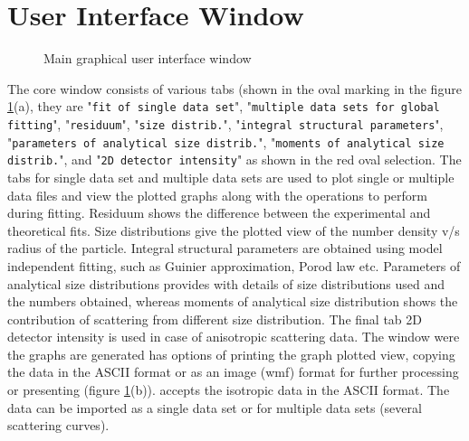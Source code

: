 \section{User Interface Window}
\begin{figure}[htb]
\centering
\caption{Main \SASfit graphical user interface window}
\label{fig:QTmain}
\end{figure}
\sloppy
The core \SASfit window consists of various tabs (shown in the oval
marking in the figure \ref{fig:QTmain}(a), they are "\texttt{fit of single data set}",
"\texttt{multiple data sets for global fitting}", "\texttt{residuum}", "\texttt{size
distrib.}", "\texttt{integral structural parameters}", "\texttt{parameters of
analytical size distrib.}", "\texttt{moments of analytical size
distrib.}", and "\texttt{2D detector intensity}" as shown in the red oval
selection. The tabs for single data set and multiple data sets are used to
plot single or multiple data files and view the plotted graphs along
with the operations to perform during fitting. Residuum shows the
difference between the experimental and theoretical fits. Size
distributions give the plotted view of the number density v/s radius
of the particle. Integral structural parameters are obtained using
model independent fitting, such as Guinier approximation, Porod law
etc. Parameters of analytical size distributions provides with
details of size distributions used and the numbers obtained, whereas
moments of analytical size distribution shows the contribution of
scattering from different size distribution. The final tab 2D
detector intensity is used in case of anisotropic scattering data.
The window were the graphs are generated has options of printing the
graph plotted view, copying the data in the ASCII format or as an
image (wmf) format for further processing or presenting (figure
\ref{fig:QTmain}(b)). \SASfit accepts the isotropic data in the ASCII
format. The data can be imported as a single data set or for
multiple data sets (several scattering curves).

